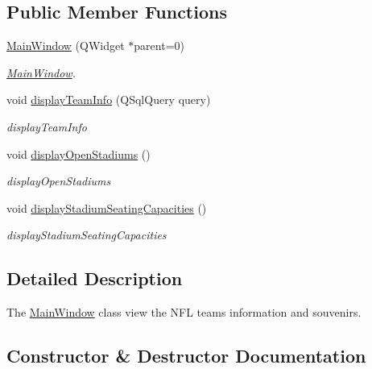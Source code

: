 \subsection*{Public Member Functions}
\begin{DoxyCompactItemize}
\item 
\hyperlink{class_main_window_a8b244be8b7b7db1b08de2a2acb9409db}{Main\+Window} (Q\+Widget $\ast$parent=0)
\begin{DoxyCompactList}\small\item\em \hyperlink{class_main_window}{Main\+Window}. \end{DoxyCompactList}\item 
void \hyperlink{class_main_window_a65071d7a414765292d760181c3d72eff}{display\+Team\+Info} (Q\+Sql\+Query query)
\begin{DoxyCompactList}\small\item\em display\+Team\+Info \end{DoxyCompactList}\item 
\mbox{\label{class_main_window_a93e72d8e127526817e7ad2ede58b392d}} 
void \hyperlink{class_main_window_a93e72d8e127526817e7ad2ede58b392d}{display\+Open\+Stadiums} ()
\begin{DoxyCompactList}\small\item\em display\+Open\+Stadiums \end{DoxyCompactList}\item 
\mbox{\label{class_main_window_a9a8bb71cb7637bfd25c19988d3f67300}} 
void \hyperlink{class_main_window_a9a8bb71cb7637bfd25c19988d3f67300}{display\+Stadium\+Seating\+Capacities} ()
\begin{DoxyCompactList}\small\item\em display\+Stadium\+Seating\+Capacities \end{DoxyCompactList}\end{DoxyCompactItemize}


\subsection{Detailed Description}
The \hyperlink{class_main_window}{Main\+Window} class view the N\+FL teams information and souvenirs. 

\subsection{Constructor \& Destructor Documentation}
\mbox{\label{class_main_window_a8b244be8b7b7db1b08de2a2acb9409db}} 
